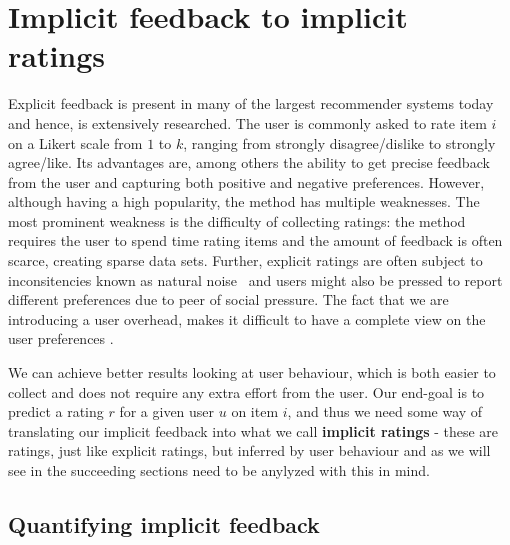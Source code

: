 




\section{Implicit feedback to implicit ratings}

Explicit feedback is present in many of the largest recommender systems today
and hence, is extensively researched. The user is commonly asked to
rate item $i$ on a Likert scale from $1$ to $k$, ranging from strongly
disagree/dislike to strongly agree/like. Its advantages are, among others the
ability to get precise feedback from the user and capturing both positive and
negative preferences. However, although having a high popularity, the method
has multiple weaknesses. The most prominent weakness is the difficulty of
collecting ratings: the method requires the user to spend time rating items and
the amount of feedback is often scarce, creating sparse data sets. Further,
explicit ratings are often subject to inconsitencies known as natural
noise \cite{amatriain2009like} and users might also be pressed to report
different preferences due to peer of social pressure. The fact that we are
introducing a user overhead, makes it difficult to have a complete view on the
user preferences \cite{jawaheer2010characterisation}.

We can achieve better results looking at user behaviour, which is both easier
to collect and does not require any extra effort from the user.  Our end-goal
is to predict a rating $r$ for a given user $u$ on item $i$, and thus we need
some way of translating our implicit feedback into what we call
\textbf{implicit ratings} - these are ratings, just like explicit ratings, but
inferred by user behaviour and as we will see in the succeeding sections need
to be anylyzed with this in mind.

\subsection{Quantifying implicit feedback}

